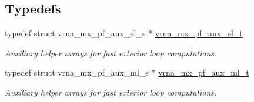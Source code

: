 \subsection*{Typedefs}
\begin{DoxyCompactItemize}
\item 
typedef struct vrna\+\_\+mx\+\_\+pf\+\_\+aux\+\_\+el\+\_\+s $\ast$ \mbox{\hyperlink{group__loops_gaf9d5160c11ffad3ec258124a77fee13c}{vrna\+\_\+mx\+\_\+pf\+\_\+aux\+\_\+el\+\_\+t}}
\begin{DoxyCompactList}\small\item\em Auxiliary helper arrays for fast exterior loop computations. \end{DoxyCompactList}\item 
typedef struct vrna\+\_\+mx\+\_\+pf\+\_\+aux\+\_\+ml\+\_\+s $\ast$ \mbox{\hyperlink{group__loops_ga39a8cc1385dcb542a60a9393cde6a1e3}{vrna\+\_\+mx\+\_\+pf\+\_\+aux\+\_\+ml\+\_\+t}}
\begin{DoxyCompactList}\small\item\em Auxiliary helper arrays for fast exterior loop computations. \end{DoxyCompactList}\end{DoxyCompactItemize}

